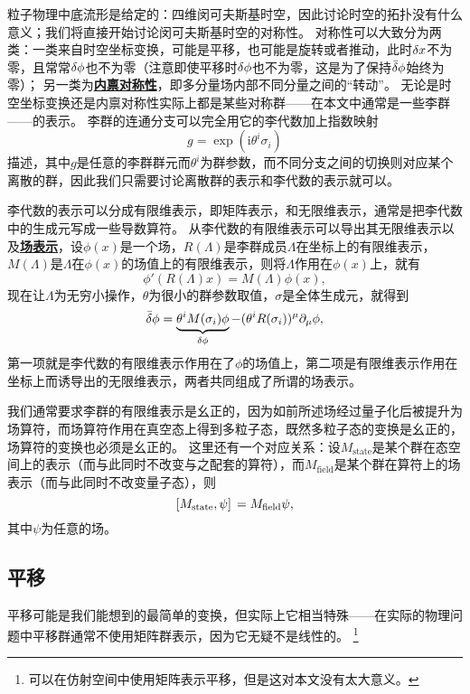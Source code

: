 \documentclass[hyperref, UTF8, a4paper]{ctexart}
\newcommand*{\ii}{\mathrm{i}}
\newcommand{\concept}[1]{\underline{\textbf{#1}}}
\begin{document}
粒子物理中底流形是给定的：四维闵可夫斯基时空，因此讨论时空的拓扑没有什么意义；我们将直接开始讨论闵可夫斯基时空的对称性。
对称性可以大致分为两类：一类来自时空坐标变换，可能是平移，也可能是旋转或者推动，此时$\var{x}$不为零，且常常$\var{\phi}$也不为零（注意即使平移时$\var{\phi}$也不为零，这是为了保持$\bar{\var}{\phi}$始终为零）；
另一类为\concept{内禀对称性}，即多分量场内部不同分量之间的“转动”。
无论是时空坐标变换还是内禀对称性实际上都是某些对称群——在本文中通常是一些李群——的表示。
李群的连通分支可以完全用它的李代数加上指数映射
\[
    g = \exp(\ii \theta^i \sigma_i)
\]
描述，其中$g$是任意的李群群元而$\theta^i$为群参数，而不同分支之间的切换则对应某个离散的群，因此我们只需要讨论离散群的表示和李代数的表示就可以。

李代数的表示可以分成有限维表示，即矩阵表示，和无限维表示，通常是把李代数中的生成元写成一些导数算符。
从李代数的有限维表示可以导出其无限维表示以及\concept{场表示}，设$\phi(x)$是一个场，$R(\Lambda)$是李群成员$\Lambda$在坐标上的有限维表示，$M(\Lambda)$是$\Lambda$在$\phi(x)$的场值上的有限维表示，则将$\Lambda$作用在$\phi(x)$上，就有
\[
    \phi'(R(\Lambda) x) = M(\Lambda) \phi(x),
\]
现在让$\Lambda$为无穷小操作，$\theta$为很小的群参数取值，$\sigma$是全体生成元，就得到
\begin{equation}
    \bar{\var}{\phi} = \underbrace{\theta^i M(\sigma_i) \phi}_{{\var{\phi}}} - (\theta^i R(\sigma_i))^\mu \partial_\mu \phi,
\end{equation}
第一项就是李代数的有限维表示作用在了$\phi$的场值上，第二项是有限维表示作用在坐标上而诱导出的无限维表示，两者共同组成了所谓的场表示。

我们通常要求李群的有限维表示是幺正的，因为如前所述场经过量子化后被提升为场算符，而场算符作用在真空态上得到多粒子态，既然多粒子态的变换是幺正的，场算符的变换也必须是幺正的。
这里还有一个对应关系：设$M_\text{state}$是某个群在态空间上的表示（而与此同时不改变与之配套的算符），而$M_\text{field}$是某个群在算符上的场表示（而与此同时不改变量子态），则
\begin{equation}
    \comm*{M_\text{state}}{\psi} = M_\text{field} \psi,
    \label{eq:field-and-state-corr}
\end{equation}
其中$\psi$为任意的场。

\subsection{平移}\label{sec:translation}

平移可能是我们能想到的最简单的变换，但实际上它相当特殊——在实际的物理问题中平移群通常不使用矩阵群表示，因为它无疑不是线性的。%
\footnote{可以在仿射空间中使用矩阵表示平移，但是这对本文没有太大意义。}
\end{document}
